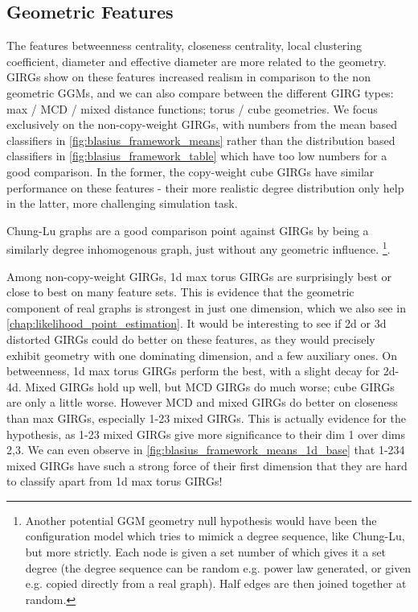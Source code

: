\subsection{Geometric Features}
The features betweenness centrality, closeness centrality, local clustering coefficient, diameter and effective diameter are more related to the geometry. GIRGs show on these features increased realism in comparison to the non geometric GGMs, and we can also compare between the different GIRG types: max / MCD / mixed distance functions; torus / cube geometries. We focus exclusively on the non-copy-weight GIRGs, with numbers from the mean based classifiers in \cref{fig:blasius_framework_means} rather than the distribution based classifiers in \cref{fig:blasius_framework_table} which have too low numbers for a good comparison. In the former, the copy-weight cube GIRGs have similar performance on these features - their more realistic degree distribution only help in the latter, more challenging simulation task.


Chung-Lu graphs are a good comparison point against GIRGs by being a similarly degree inhomogenous graph, just without any geometric influence.
\footnote{Another potential GGM geometry null hypothesis would have been the configuration model which tries to mimick a degree sequence, like Chung-Lu, but more strictly. Each node is given a set number of  which gives it a set degree (the degree sequence can be random e.g. power law generated, or given e.g. copied directly from a real graph). Half edges are then joined together at random.}.



Among non-copy-weight GIRGs, 1d max torus GIRGs are surprisingly best or close to best on many feature sets. This is evidence that the geometric component of real graphs is strongest in just one dimension, which we also see in \cref{chap:likelihood_point_estimation}. It would be interesting to see if 2d or 3d distorted GIRGs could do better on these features, as they would precisely exhibit geometry with one dominating dimension, and a few auxiliary ones.
On betweenness, 1d max torus GIRGs perform the best, with a slight decay for 2d-4d. Mixed GIRGs hold up well, but MCD GIRGs do much worse; cube GIRGs are only a little worse.
However MCD and mixed GIRGs do better on closeness than max GIRGs, especially 1-23 mixed GIRGs. This is actually evidence for the  hypothesis, as 1-23 mixed GIRGs give more significance to their dim 1 over dims 2,3. We can even observe in \cref{fig:blasius_framework_means_1d_base} that 1-234 mixed GIRGs have such a strong force of their first dimension that they are hard to classify apart from 1d max torus GIRGs!

